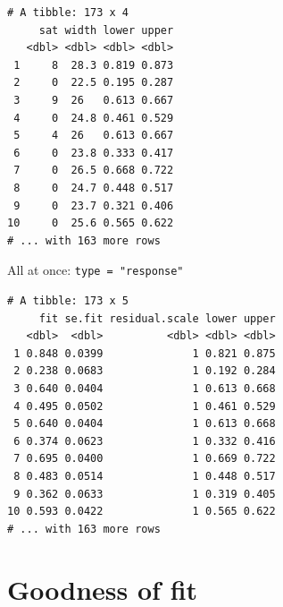 \documentclass[]{book}
\newenvironment{Shaded}{\begin{snugshade}}{\end{snugshade}}
\newcommand{\DataTypeTok}[1]{\textcolor[rgb]{0.13,0.29,0.53}{#1}}
\newcommand{\DecValTok}[1]{\textcolor[rgb]{0.00,0.00,0.81}{#1}}
\newcommand{\KeywordTok}[1]{\textcolor[rgb]{0.13,0.29,0.53}{\textbf{#1}}}
\newcommand{\NormalTok}[1]{#1}
\newcommand{\OperatorTok}[1]{\textcolor[rgb]{0.81,0.36,0.00}{\textbf{#1}}}
\newcommand{\OtherTok}[1]{\textcolor[rgb]{0.56,0.35,0.01}{#1}}
\newcommand{\StringTok}[1]{\textcolor[rgb]{0.31,0.60,0.02}{#1}}
\begin{document}
\begin{verbatim}
# A tibble: 173 x 4
     sat width lower upper
   <dbl> <dbl> <dbl> <dbl>
 1     8  28.3 0.819 0.873
 2     0  22.5 0.195 0.287
 3     9  26   0.613 0.667
 4     0  24.8 0.461 0.529
 5     4  26   0.613 0.667
 6     0  23.8 0.333 0.417
 7     0  26.5 0.668 0.722
 8     0  24.7 0.448 0.517
 9     0  23.7 0.321 0.406
10     0  25.6 0.565 0.622
# ... with 163 more rows
\end{verbatim}

All at once: \texttt{type\ =\ "response"}

\begin{Shaded}
\end{Shaded}

\begin{verbatim}
# A tibble: 173 x 5
     fit se.fit residual.scale lower upper
   <dbl>  <dbl>          <dbl> <dbl> <dbl>
 1 0.848 0.0399              1 0.821 0.875
 2 0.238 0.0683              1 0.192 0.284
 3 0.640 0.0404              1 0.613 0.668
 4 0.495 0.0502              1 0.461 0.529
 5 0.640 0.0404              1 0.613 0.668
 6 0.374 0.0623              1 0.332 0.416
 7 0.695 0.0400              1 0.669 0.722
 8 0.483 0.0514              1 0.448 0.517
 9 0.362 0.0633              1 0.319 0.405
10 0.593 0.0422              1 0.565 0.622
# ... with 163 more rows
\end{verbatim}

\hypertarget{goodness-of-fit-1}{%
\section{Goodness of fit}\label{goodness-of-fit-1}}
\end{document}
